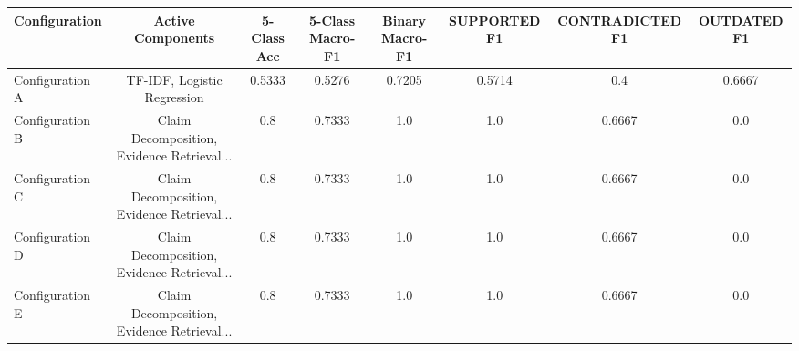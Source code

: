 \begin{tabular}{lccccccc}
\hline
Configuration & Active Components & 5-Class Acc & 5-Class Macro-F1 & Binary Macro-F1 & SUPPORTED F1 & CONTRADICTED F1 & OUTDATED F1 \\
\hline
Configuration A & TF-IDF, Logistic Regression & 0.5333 & 0.5276 & 0.7205 & 0.5714 & 0.4 & 0.6667 \\
Configuration B & Claim Decomposition, Evidence Retrieval... & 0.8 & 0.7333 & 1.0 & 1.0 & 0.6667 & 0.0 \\
Configuration C & Claim Decomposition, Evidence Retrieval... & 0.8 & 0.7333 & 1.0 & 1.0 & 0.6667 & 0.0 \\
Configuration D & Claim Decomposition, Evidence Retrieval... & 0.8 & 0.7333 & 1.0 & 1.0 & 0.6667 & 0.0 \\
Configuration E & Claim Decomposition, Evidence Retrieval... & 0.8 & 0.7333 & 1.0 & 1.0 & 0.6667 & 0.0 \\
\hline
\end{tabular}
